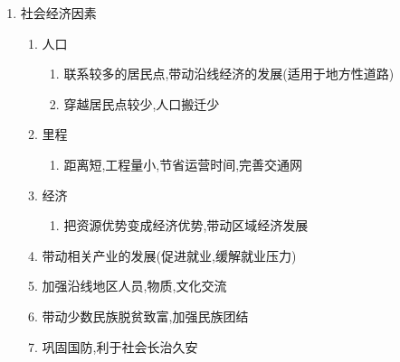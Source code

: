 \documentclass[a4paper]{article}
\begin{document}
\begin{enumerate}
\begin{enumerate}
\begin{enumerate}
\begin{enumerate}
                \end{enumerate}
            \end{enumerate}
        \end{enumerate}
        \item 社会经济因素
        \begin{enumerate}
            \item 人口
            \begin{enumerate}
                \item 联系较多的居民点,带动沿线经济的发展(适用于地方性道路)
                \item 穿越居民点较少,人口搬迁少
            \end{enumerate}
            \item 里程
            \begin{enumerate}
                \item 距离短,工程量小,节省运营时间,完善交通网
            \end{enumerate}
            \item 经济
            \begin{enumerate}
                \item 把资源优势变成经济优势,带动区域经济发展
            \end{enumerate}
            \item 带动相关产业的发展(促进就业,缓解就业压力)
            \item 加强沿线地区人员,物质,文化交流
            \item 带动少数民族脱贫致富,加强民族团结
            \item 巩固国防,利于社会长治久安
        \end{enumerate}
    \end{enumerate}
\end{document}
